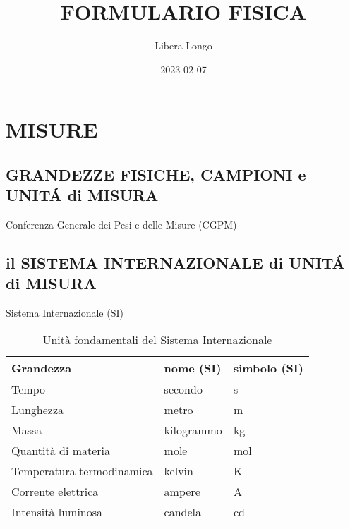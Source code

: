 \documentclass{article}
\title{FORMULARIO FISICA}
\date{2023-02-07}
\author{Libera Longo}
\begin{document}
	\maketitle
\begin{comment}
			\begin{equation}  \end{equation}
			\begin{equation}  \end{equation}
\end{comment}
	\section{MISURE}

		\subsection{GRANDEZZE FISICHE, CAMPIONI e UNIT\'A di MISURA}
			Conferenza Generale dei Pesi e delle Misure (CGPM)

		\subsection{il SISTEMA INTERNAZIONALE di UNIT\'A di MISURA}
			Sistema Internazionale (SI)

			\begin{table}[!htb]
			\begin{tabular}{|l|l|l|}
				\hline
				Grandezza & nome (SI) & simbolo (SI) \\ \hline
				Tempo & secondo & s \\
				Lunghezza & metro & m \\
				Massa & kilogrammo & kg \\
				Quantità di materia & mole & mol \\
				Temperatura termodinamica & kelvin & K \\
				Corrente elettrica & ampere & A \\
				Intensità luminosa & candela & cd \\ \hline
			\end{tabular}
			\caption{Unità fondamentali del Sistema Internazionale}
			\end{table}
\end{document}
